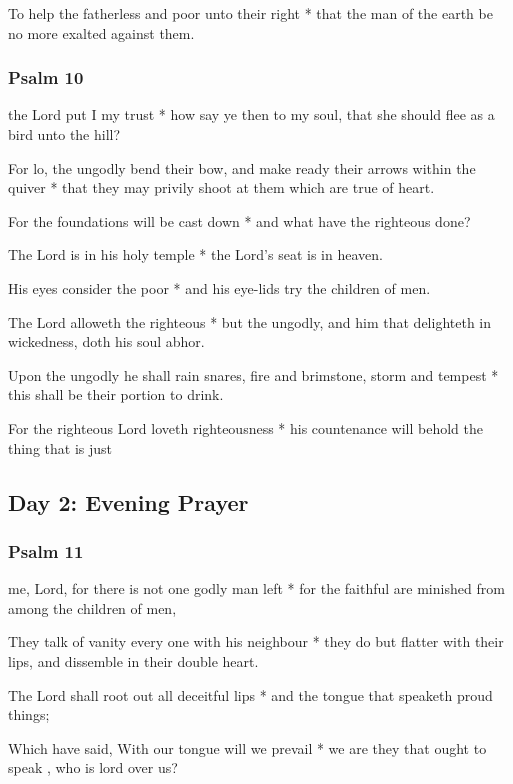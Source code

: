 To help the fatherless and poor unto their right * that the man of the earth be no more exalted against them.

\subsubsection{Psalm 10}


 the Lord put I my trust * how say ye then to my soul, that she should flee as a bird unto the hill?

For lo, the ungodly bend their bow, and make ready their arrows within the quiver * that they may privily shoot at them which are true of heart.

For the foundations will be cast down * and what have the righteous done?

The Lord is in his holy temple * the Lord's seat is in heaven.

His eyes consider the poor * and his eye-lids try the children of men.

The Lord alloweth the righteous * but the ungodly, and him that delighteth in wickedness, doth his soul abhor.

Upon the ungodly he shall rain snares, fire and brimstone, storm and tempest * this shall be their portion to drink.

For the righteous Lord loveth righteousness * his countenance will behold the thing that is just

\subsection{Day 2: Evening Prayer}

\subsubsection{Psalm 11}


 me, Lord, for there is not one godly man left * for the faithful are minished from among the children of men,

They talk of vanity every one with his neighbour * they do but flatter with their lips, and dissemble in their double heart.

The Lord shall root out all deceitful lips * and the tongue that speaketh proud things;

Which have said, With our tongue will we prevail * we are they that ought to speak , who is lord over us?

